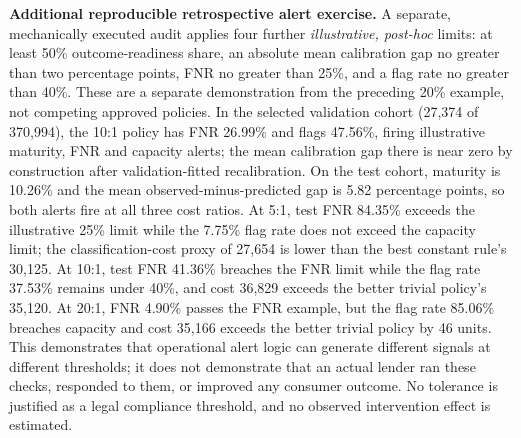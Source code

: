 \documentclass[10pt]{article}
\begin{document}
\noindent\textbf{Additional reproducible retrospective alert exercise.} A separate, mechanically executed audit applies four further \emph{illustrative, post-hoc} limits: at least 50\% outcome-readiness share, an absolute mean calibration gap no greater than two percentage points, FNR no greater than 25\%, and a flag rate no greater than 40\%. These are a separate demonstration from the preceding 20\% example, not competing approved policies. In the selected validation cohort (27,374 of 370,994), the 10:1 policy has FNR 26.99\% and flags 47.56\%, firing illustrative maturity, FNR and capacity alerts; the mean calibration gap there is near zero by construction after validation-fitted recalibration. On the test cohort, maturity is 10.26\% and the mean observed-minus-predicted gap is 5.82 percentage points, so both alerts fire at all three cost ratios. At 5:1, test FNR 84.35\% exceeds the illustrative 25\% limit while the 7.75\% flag rate does not exceed the capacity limit; the classification-cost proxy of 27,654 is lower than the best constant rule's 30,125. At 10:1, test FNR 41.36\% breaches the FNR limit while the flag rate 37.53\% remains under 40\%, and cost 36,829 exceeds the better trivial policy's 35,120. At 20:1, FNR 4.90\% passes the FNR example, but the flag rate 85.06\% breaches capacity and cost 35,166 exceeds the better trivial policy by 46 units. This demonstrates that operational alert logic can generate different signals at different thresholds; it does not demonstrate that an actual lender ran these checks, responded to them, or improved any consumer outcome. No tolerance is justified as a legal compliance threshold, and no observed intervention effect is estimated.
\end{document}
